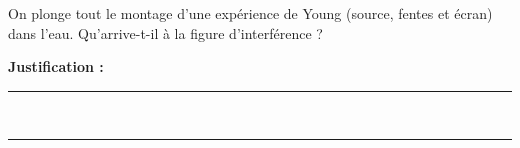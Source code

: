 On plonge tout le montage d'une expérience de Young (source, fentes et écran) dans l'eau. Qu'arrive-t-il à la figure d'interférence ?

\choices

\noindent\textbf{Justification :} \hrulefill \\[2.5ex]
\rule{\linewidth}{0.4pt} \\[2.5ex]
\rule{\linewidth}{0.4pt}
\vfill
